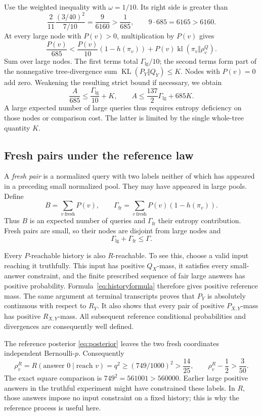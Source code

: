 \documentclass[11pt]{article}
\theoremstyle{definition}
\theoremstyle{remark}
\newcommand{\KL}{\operatorname{KL}}
\newcommand{\kl}{\operatorname{kl}}
\newcommand{\Glg}{\Gamma_{\mathrm{lg}}}
\newcommand{\Gfr}{\Gamma_{\mathrm{fr}}}
\numberwithin{equation}{section}
\begin{document}
Use the weighted inequality with \(\omega=1/10\).
Its right side is greater than
\[
 \frac2{11}\frac{(3/40)^2}{7/10}
 =\frac9{6160}>\frac1{685},
 \qquad 9\cdot685=6165>6160.
\]
At every large node with \(P(v)>0\), multiplication by \(P(v)\) gives
\[
 \frac{P(v)}{685}
 <\frac{P(v)}{10}(1-h(\pi_v))
   +P(v)\kl(\pi_v\Vert\rho_v^Q).
\]
Sum over large nodes. The first terms total \(\Glg/10\);
the second terms form part of the nonnegative tree-divergence sum
\(\KL(P_Y\Vert Q_Y)\le K\). Nodes with \(P(v)=0\) add zero.
Weakening the resulting strict bound if necessary, we obtain
\begin{equation}\label{eq:Alarge}
 \frac A{685}\le\frac{\Glg}{10}+K,\qquad
 \boxed{A\le\frac{137}{2}\Glg+685K.}
\end{equation}
A large expected number of large queries thus requires entropy
deficiency on those nodes or comparison cost. The latter is limited
by the single whole-tree quantity \(K\).

\subsection{Fresh pairs under the reference law}

A \emph{fresh pair} is a normalized query with two labels neither
of which has appeared in a preceding small normalized pool.
They may have appeared in large pools. Define
\[
 B=\sum_{v\ \mathrm{fresh}}P(v),\qquad
 \Gfr=\sum_{v\ \mathrm{fresh}}P(v)(1-h(\pi_v)).
\]
Thus \(B\) is an expected number of queries and \(\Gfr\) their
entropy contribution. Fresh pairs are small, so their nodes are
disjoint from large nodes and
\begin{equation}\label{eq:entropysplit}
 \Glg+\Gfr\le\Gamma.
\end{equation}

Every \(P\)-reachable history is also \(R\)-reachable. To see this,
choose a valid input reaching it truthfully. This input has positive
\(Q_X\)-mass, it satisfies every small-answer constraint, and the
finite prescribed sequence of fair large answers has positive
probability. Formula~\eqref{eq:historyformula} therefore gives positive
reference mass. The same argument at terminal transcripts proves
that \(P_Y\) is absolutely continuous with respect to \(R_Y\).
It also shows that every pair of positive \(P_{X,Y}\)-mass has
positive \(R_{X,Y}\)-mass. All subsequent reference conditional
probabilities and divergences are consequently well defined.

The reference posterior \eqref{eq:posterior} leaves the two fresh
coordinates independent Bernoulli-\(p\). Consequently
\[
 \rho_v^R=R(\text{answer }0\mid\text{reach }v)=q^2
 \ge(749/1000)^2>\frac{14}{25},\qquad
 \rho_v^R-\frac12>\frac3{50}.
\]
The exact square comparison is \(749^2=561001>560000\).
Earlier large positive answers in the truthful experiment might have
constrained these labels. In \(R\), those answers impose no input
constraint on a fixed history; this is why the reference process is
useful here.
\end{document}
